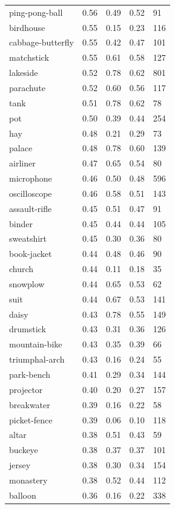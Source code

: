\begin{center}
\begin{longtable}{lllll}
ping-pong-ball & 0.56 & 0.49 & 0.52 & 91 \\
birdhouse & 0.55 & 0.15 & 0.23 & 116 \\
cabbage-butterfly & 0.55 & 0.42 & 0.47 & 101 \\
matchstick & 0.55 & 0.61 & 0.58 & 127 \\
lakeside & 0.52 & 0.78 & 0.62 & 801 \\
parachute & 0.52 & 0.60 & 0.56 & 117 \\
tank & 0.51 & 0.78 & 0.62 & 78 \\
pot & 0.50 & 0.39 & 0.44 & 254 \\
hay & 0.48 & 0.21 & 0.29 & 73 \\
palace & 0.48 & 0.78 & 0.60 & 139 \\
airliner & 0.47 & 0.65 & 0.54 & 80 \\
microphone & 0.46 & 0.50 & 0.48 & 596 \\
oscilloscope & 0.46 & 0.58 & 0.51 & 143 \\
assault-rifle & 0.45 & 0.51 & 0.47 & 91 \\
binder & 0.45 & 0.44 & 0.44 & 105 \\
sweatshirt & 0.45 & 0.30 & 0.36 & 80 \\
book-jacket & 0.44 & 0.48 & 0.46 & 90 \\
church & 0.44 & 0.11 & 0.18 & 35 \\
snowplow & 0.44 & 0.65 & 0.53 & 62 \\
suit & 0.44 & 0.67 & 0.53 & 141 \\
daisy & 0.43 & 0.78 & 0.55 & 149 \\
drumstick & 0.43 & 0.31 & 0.36 & 126 \\
mountain-bike & 0.43 & 0.35 & 0.39 & 66 \\
triumphal-arch & 0.43 & 0.16 & 0.24 & 55 \\
park-bench & 0.41 & 0.29 & 0.34 & 144 \\
projector & 0.40 & 0.20 & 0.27 & 157 \\
breakwater & 0.39 & 0.16 & 0.22 & 58 \\
picket-fence & 0.39 & 0.06 & 0.10 & 118 \\
altar & 0.38 & 0.51 & 0.43 & 59 \\
buckeye & 0.38 & 0.37 & 0.37 & 101 \\
jersey & 0.38 & 0.30 & 0.34 & 154 \\
monastery & 0.38 & 0.52 & 0.44 & 112 \\
balloon & 0.36 & 0.16 & 0.22 & 338 \\

\end{longtable}
\end{center}

